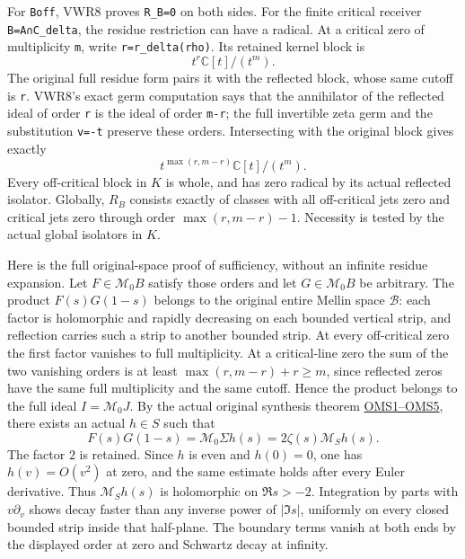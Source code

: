 For \texttt{Boff}, VWR8 proves \texttt{R\_B=0} on both sides. For the
finite critical receiver \texttt{B=A∩C\_delta}, the residue restriction
can have a radical. At a critical zero of multiplicity \texttt{m}, write
\texttt{r=r\_delta(rho)}. Its retained kernel block is \[
t^r\mathbb C[t]/(t^m).
\] The original full residue form pairs it with the reflected block,
whose same cutoff is \texttt{r}. VWR8's exact germ computation says that
the annihilator of the reflected ideal of order \texttt{r} is the ideal
of order \texttt{m-r}; the full invertible zeta germ and the
substitution \texttt{v=-t} preserve these orders. Intersecting with the
original block gives exactly \[
t^{\max(r,m-r)}\mathbb C[t]/(t^m).
\tag{CHC6.6}
\] Every off-critical block in \(K\) is whole, and has zero radical by
its actual reflected isolator. Globally, \(R_B\) consists exactly of
classes with all off-critical jets zero and critical jets zero through
order \(\max(r,m-r)-1\). Necessity is tested by the actual global
isolators in \(K\).

Here is the full original-space proof of sufficiency, without an
infinite residue expansion. Let \(F\in\mathcal M_0B\) satisfy those
orders and let \(G\in\mathcal M_0B\) be arbitrary. The product
\(F(s)G(1-s)\) belongs to the original entire Mellin space
\(\mathcal B\): each factor is holomorphic and rapidly decreasing on
each bounded vertical strip, and reflection carries such a strip to
another bounded strip. At every off-critical zero the first factor
vanishes to full multiplicity. At a critical-line zero the sum of the
two vanishing orders is at least \(\max(r,m-r)+r\ge m\), since reflected
zeros have the same full multiplicity and the same cutoff. Hence the
product belongs to the full ideal \(I=\mathcal M_0J\). By the actual
original synthesis theorem
\href{https://github.com/KokunoYumeto/zeta-function-research-reader/blob/36a82ecca98addb8a98b48204e349737856c7223/workbenches/splitzero-tandem/continuations/20260924-cohomology-weight-and-character-lifts/original-character-lifting/tau_lifting_weights_20260924/ORIGINAL_MELLIN_SPECTRAL_SYNTHESIS.md}{OMS1--OMS5},
there exists an actual \(h\in S\) such that \[
F(s)G(1-s)=\mathcal M_0\Sigma h(s)
=2\zeta(s)\mathcal M_Sh(s).
\tag{CHC6.7}
\] The factor \(2\) is retained. Since \(h\) is even and \(h(0)=0\), one
has \(h(v)=O(v^2)\) at zero, and the same estimate holds after every
Euler derivative. Thus \(\mathcal M_Sh(s)\) is holomorphic on
\(\Re s>-2\). Integration by parts with \(v\partial_v\) shows decay
faster than any inverse power of \(|\Im s|\), uniformly on every closed
bounded strip inside that half-plane. The boundary terms vanish at both
ends by the displayed order at zero and Schwartz decay at infinity.

